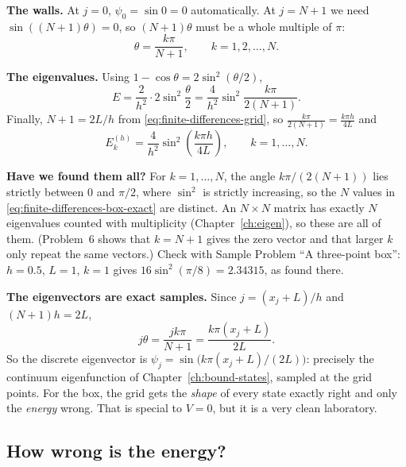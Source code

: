 \textbf{The walls.} At $j=0$, $\psi_0=\sin0=0$ automatically. At $j=N+1$ we need $\sin((N+1)\theta)=0$, so $(N+1)\theta$ must be a whole multiple of $\pi$:
\begin{equation*}
\theta=\frac{k\pi}{N+1},\qquad k=1,2,\dots,N.
\end{equation*}

\textbf{The eigenvalues.} Using $1-\cos\theta=2\sin^2(\theta/2)$,
\begin{equation*}
E=\frac{2}{h^2}\cdot2\sin^2\frac{\theta}{2}=\frac{4}{h^2}\sin^2\frac{k\pi}{2(N+1)}.
\end{equation*}
Finally, $N+1=2L/h$ from \eqref{eq:finite-differences-grid}, so $\frac{k\pi}{2(N+1)}=\frac{k\pi h}{4L}$ and
\begin{equation}
\boxed{\;E_k^{(h)}=\frac{4}{h^2}\sin^2\!\left(\frac{k\pi h}{4L}\right),\qquad k=1,\dots,N.\;}
\label{eq:finite-differences-box-exact}
\end{equation}

\textbf{Have we found them all?} For $k=1,\dots,N$, the angle $k\pi/(2(N+1))$ lies strictly between $0$ and $\pi/2$, where $\sin^2$ is strictly increasing, so the $N$ values in \eqref{eq:finite-differences-box-exact} are distinct. An $N\times N$ matrix has exactly $N$ eigenvalues counted with multiplicity (Chapter~\ref{ch:eigen}), so these are all of them. (Problem~6 shows that $k=N+1$ gives the zero vector and that larger $k$ only repeat the same vectors.) Check with Sample Problem ``A three-point box'': $h=0.5$, $L=1$, $k=1$ gives $16\sin^2(\pi/8)=2.34315$, as found there.

\textbf{The eigenvectors are exact samples.} Since $j=(x_j+L)/h$ and $(N+1)h=2L$,
\begin{equation*}
j\theta=\frac{jk\pi}{N+1}=\frac{k\pi(x_j+L)}{2L}.
\end{equation*}
So the discrete eigenvector is $\psi_j=\sin\big(k\pi(x_j+L)/(2L)\big)$: precisely the continuum eigenfunction of Chapter~\ref{ch:bound-states}, sampled at the grid points. For the box, the grid gets the \emph{shape} of every state exactly right and only the \emph{energy} wrong. That is special to $V=0$, but it is a very clean laboratory.

\subsection{How wrong is the energy?}

